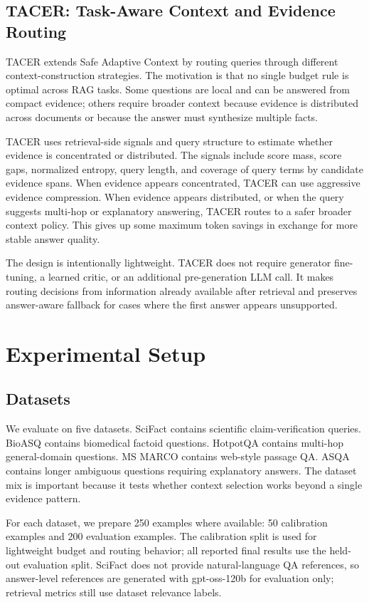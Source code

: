 \documentclass[11pt]{article}
\begin{document}
\subsection{TACER: Task-Aware Context and Evidence Routing}

TACER extends Safe Adaptive Context by routing queries through different context-construction strategies. The motivation is that no single budget rule is optimal across RAG tasks. Some questions are local and can be answered from compact evidence; others require broader context because evidence is distributed across documents or because the answer must synthesize multiple facts.

TACER uses retrieval-side signals and query structure to estimate whether evidence is concentrated or distributed. The signals include score mass, score gaps, normalized entropy, query length, and coverage of query terms by candidate evidence spans. When evidence appears concentrated, TACER can use aggressive evidence compression. When evidence appears distributed, or when the query suggests multi-hop or explanatory answering, TACER routes to a safer broader context policy. This gives up some maximum token savings in exchange for more stable answer quality.

The design is intentionally lightweight. TACER does not require generator fine-tuning, a learned critic, or an additional pre-generation LLM call. It makes routing decisions from information already available after retrieval and preserves answer-aware fallback for cases where the first answer appears unsupported.

\section{Experimental Setup}

\subsection{Datasets}

We evaluate on five datasets. SciFact contains scientific claim-verification queries. BioASQ contains biomedical factoid questions. HotpotQA contains multi-hop general-domain questions. MS MARCO contains web-style passage QA. ASQA contains longer ambiguous questions requiring explanatory answers. The dataset mix is important because it tests whether context selection works beyond a single evidence pattern.

For each dataset, we prepare 250 examples where available: 50 calibration examples and 200 evaluation examples. The calibration split is used for lightweight budget and routing behavior; all reported final results use the held-out evaluation split. SciFact does not provide natural-language QA references, so answer-level references are generated with gpt-oss-120b for evaluation only; retrieval metrics still use dataset relevance labels.
\end{document}
